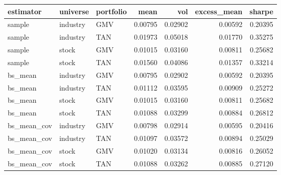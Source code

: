 \begin{tabular}{lllrrrr}
\toprule
estimator & universe & portfolio & mean & vol & excess\_mean & sharpe \\
\midrule
sample & industry & GMV & 0.00795 & 0.02902 & 0.00592 & 0.20395 \\
sample & industry & TAN & 0.01973 & 0.05018 & 0.01770 & 0.35275 \\
sample & stock & GMV & 0.01015 & 0.03160 & 0.00811 & 0.25682 \\
sample & stock & TAN & 0.01560 & 0.04086 & 0.01357 & 0.33214 \\
bs\_mean & industry & GMV & 0.00795 & 0.02902 & 0.00592 & 0.20395 \\
bs\_mean & industry & TAN & 0.01112 & 0.03595 & 0.00909 & 0.25272 \\
bs\_mean & stock & GMV & 0.01015 & 0.03160 & 0.00811 & 0.25682 \\
bs\_mean & stock & TAN & 0.01088 & 0.03299 & 0.00884 & 0.26812 \\
bs\_mean\_cov & industry & GMV & 0.00798 & 0.02914 & 0.00595 & 0.20416 \\
bs\_mean\_cov & industry & TAN & 0.01097 & 0.03572 & 0.00894 & 0.25029 \\
bs\_mean\_cov & stock & GMV & 0.01020 & 0.03134 & 0.00816 & 0.26052 \\
bs\_mean\_cov & stock & TAN & 0.01088 & 0.03262 & 0.00885 & 0.27120 \\
\bottomrule
\end{tabular}
